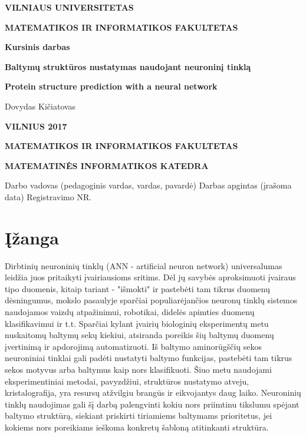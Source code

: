 \documentclass[a4paper,12pt]{article}
\begin{document}
\begin{titlepage}
\vskip 20pt
\centerline{\bf \large VILNIAUS UNIVERSITETAS}
\bigskip
\centerline{\large \textbf{MATEMATIKOS IR INFORMATIKOS FAKULTETAS}}
\vskip 120pt
\centerline{\bf \Large \textbf{Kursinis darbas}}
\vskip 50pt
\begin{center}
{\bf \LARGE Baltymų struktūros nustatymas naudojant neuroninį tinklą}
\end{center}
\bigskip
\begin{center}
{\bf \Large Protein structure prediction with a neural network}
\end{center}
\bigskip
\centerline{\Large Dovydas Kičiatovas}
\vskip 90pt
\vskip 120pt
\centerline{\large \textbf{VILNIUS 2017}}
\end{titlepage}
\begin{titlepage}
\centerline {\bf \large MATEMATIKOS IR INFORMATIKOS FAKULTETAS}
\centerline {\bf MATEMATINĖS INFORMATIKOS KATEDRA}
\vskip 120pt
\large Darbo vadovas (pedagoginis vardas, vardas, pavardė) \underline{\hskip 95pt}
\vskip 150pt
{\large Darbas apgintas  (įrašoma data) }
\vskip 120pt
{\large Registravimo NR. \underline{\hskip 95pt }}
\end{titlepage}
\begin{abstract}

\end{abstract}
\newpage
\tableofcontents
\newpage
\section{Įžanga}
\indent\indent 
Dirbtinių neuroninių tinklų (ANN - artificial neuron network) universalumas leidžia juos pritaikyti įvairiausioms sritims. Dėl jų savybės aproksimuoti įvairaus tipo duomenis, kitaip tariant - "išmokti" ir pastebėti tam tikrus duomenų dėsningumus, mokslo pasaulyje sparčiai populiarėjančios neuronų tinklų sistemos naudojamos vaizdų atpažinimui, robotikai, didelės apimties duomenų klasifikavimui ir t.t. Sparčiai kylant įvairių biologinių eksperimentų metu nuskaitomų baltymų sekų kiekiui, atsiranda poreikis šių baltymų duomenų įvertinimą ir apdorojimą automatizuoti. Iš baltymo aminorūgščių sekos neuroniniai tinklai gali padėti nustatyti baltymo funkcijas, pastebėti tam tikrus sekos motyvus arba baltymus kaip nors klasifikuoti. Šiuo metu naudojami eksperimentiniai metodai, pavyzdžiui, struktūros nustatymo atveju, kristalografija, yra resursų atžvilgiu brangūs ir eikvojantys daug laiko. Neuroninių tinklų naudojimas gali šį darbą palengvinti kokiu nors priimtinu tikslumu spėjant baltymo struktūrą, siekiant priskirti tiriamiems baltymams prioritetus, jei kokiems nors poreikiams ieškoma konkretų šabloną atitinkanti struktūra. 
\end{document}
